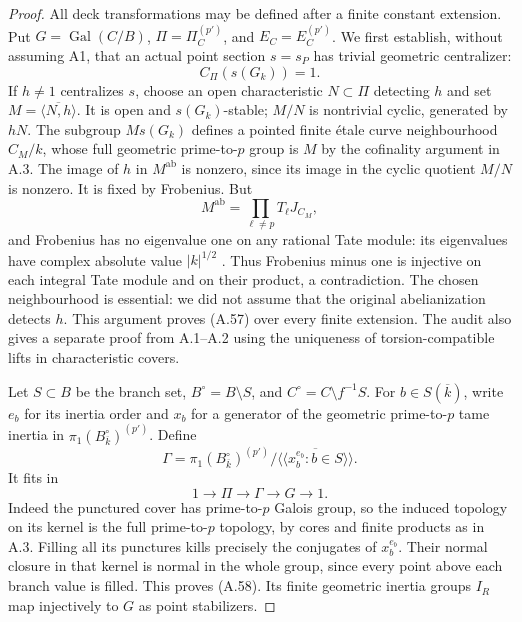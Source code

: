 \begin{proof}
All deck transformations may be defined after a finite
constant extension. Put $G=\operatorname{Gal}(C/B)$,
$\Pi=\Pi_C^{(p')}$, and $E_C=E_C^{(p')}$.
We first establish, without assuming A1, that an actual
point section $s=s_P$ has trivial geometric centralizer:
\[
 C_\Pi(s(G_k))=1.                                      \tag{A.57}
\]
If $h\ne1$ centralizes $s$, choose an open characteristic
$N\subset\Pi$ detecting $h$ and set
$M=\overline{\langle N,h\rangle}$.
It is open and $s(G_k)$-stable; $M/N$ is nontrivial
cyclic, generated by $hN$. The subgroup $Ms(G_k)$
defines a pointed finite \'etale curve neighbourhood
$C_M/k$, whose full geometric prime-to-$p$ group is
$M$ by the cofinality argument in A.3. The image of
$h$ in $M^{\mathrm{ab}}$ is nonzero, since its image
in the cyclic quotient $M/N$ is nonzero. It is fixed
by Frobenius. But
\[
 M^{\mathrm{ab}}=\prod_{\ell\ne p}T_\ell J_{C_M},
\]
and Frobenius has no eigenvalue one on any rational
Tate module: its eigenvalues have complex absolute
value $|k|^{1/2}$ \citep[II, Theorem 1.1]{A_Milne2008}.
Thus Frobenius minus one is injective on each integral
Tate module and on their product, a contradiction.
The chosen neighbourhood is essential: we did not
assume that the original abelianization detects $h$.
This argument proves \textup{(A.57)} over every finite
extension. The audit also gives a separate proof from
A.1--A.2 using the uniqueness of torsion-compatible
lifts in characteristic covers.

Let $S\subset B$ be the branch set,
$B^\circ=B\setminus S$, and
$C^\circ=C\setminus f^{-1}S$. For $b\in S(\overline k)$,
write $e_b$ for its inertia order and $x_b$ for a
generator of the geometric prime-to-$p$ tame inertia
in $\pi_1(B^\circ_{\overline k})^{(p')}$.
Define
\[
 \Gamma=\pi_1(B^\circ_{\overline k})^{(p')}
    /\overline{\langle\!\langle x_b^{e_b}:b\in S
                         \rangle\!\rangle}.
\]
It fits in
\[
 1\longrightarrow\Pi\longrightarrow\Gamma
       \longrightarrow G\longrightarrow1.             \tag{A.58}
\]
Indeed the punctured cover has prime-to-$p$ Galois
group, so the induced topology on its kernel is the
full prime-to-$p$ topology, by cores and finite
products as in A.3. Filling all its punctures kills
precisely the conjugates of $x_b^{e_b}$. Their normal
closure in that kernel is normal in the whole group,
since every point above each branch value is filled.
This proves \textup{(A.58)}. Its finite geometric
inertia groups $I_R$ map injectively to $G$ as point
stabilizers.


\end{proof}
